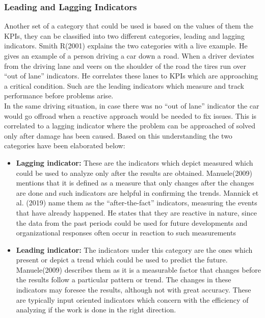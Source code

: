 \subsubsection{Leading and Lagging Indicators}

Another set of a category that could be used is based on the values of them the KPIs, they can be classified into two different categories, leading and lagging indicators. Smith R(2001) explains the two categories with a live example. He gives an example of a person driving a car down a road. When a driver deviates from the driving lane and veers on the shoulder of the road the tires run over “out of lane” indicators. He correlates these lanes to KPIs which are approaching a critical condition. Such are the leading indicators which measure and track performance before problems arise.  \\

In the same driving situation, in case there was no “out of lane” indicator the car would go offroad when a reactive approach would be needed to fix issues. This is correlated to a lagging indicator where the problem can be approached of solved only after damage has been caused. Based on this understanding the two categories have been elaborated below:\\

\begin{itemize}
    \item \textbf{Lagging indicator:}
    These are the indicators which depict measured which could be used to analyze only after the results are obtained. Manuele(2009) mentions that it is defined as a measure that only changes after the changes are done and such indicators are helpful in confirming the trends. Mannick et al. (2019) name them as the “after-the-fact” indicators, measuring the events that have already happened. He states that they are reactive in nature, since the data from the past periods could be used for future developments and organizational responses often occur in reaction to such measurements\\  

    \item \textbf{Leading indicator:}
    The indicators under this category are the ones which present or depict a trend which could be used to predict the future. Manuele(2009) describes them as it is a measurable factor that changes before the results follow a  particular pattern or trend. The changes in these indicators may foresee the results, although not with great accuracy. These are typically input oriented indicators which concern with the efficiency of analyzing if the work is done in the right direction.\\
\end{itemize}


